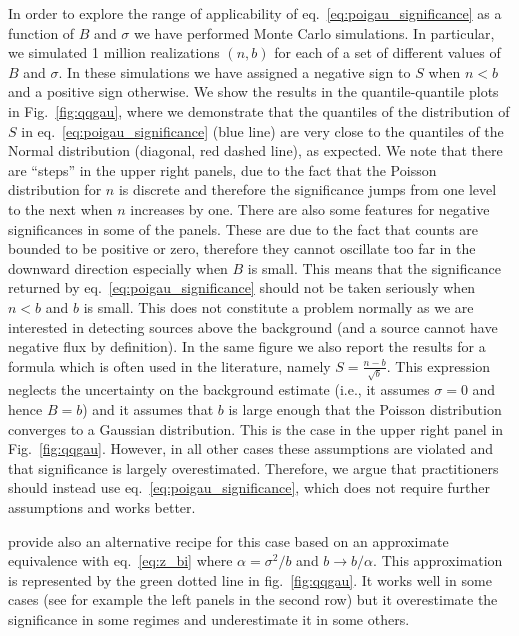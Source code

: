 \documentclass[twocolumn]{aastex61}
\renewcommand{\textbf}{}
\begin{document}
In order to explore the range of applicability of eq.~\ref{eq:poigau_significance} as a function of $B$ and $\sigma$ we have performed Monte Carlo simulations. In particular, we simulated 1 million realizations $(n, b)$ for each of a set of different values of $B$ and $\sigma$. In these simulations we have assigned a negative sign to $S$ when $n<b$ and a positive sign otherwise. We show the results in the quantile-quantile plots in Fig.~\ref{fig:qqgau}, where we demonstrate that the quantiles of the distribution of $S$ in eq.~\ref{eq:poigau_significance} (blue line) are very close to the quantiles of the Normal distribution (diagonal, red dashed line), as expected. We note that there are ``steps'' in the upper right panels, due to the fact that the Poisson distribution for $n$ is discrete and therefore the significance jumps from one level to the next when $n$ increases by one. There are also some features for negative significances in some of the panels. These are due to the fact that counts are bounded to be positive or zero, therefore they cannot oscillate too far in the downward direction especially when $B$ is small. This means that the significance returned by eq.~\ref{eq:poigau_significance} should not be taken seriously when $n < b$ and $b$ is small. This does not constitute a problem normally as we are interested in detecting sources above the background (and a source cannot have negative flux by definition).
\textbf{In the same figure we also report the results for a formula which is often used in the literature, namely $S=\frac{n-b}{\sqrt{b}}$. This expression neglects the uncertainty on the background estimate (i.e., it assumes $\sigma=0$ and hence $B=b$) and it assumes that $b$ is large enough that the Poisson distribution converges to a Gaussian distribution. This is the case in the upper right panel in Fig.~\ref{fig:qqgau}. However, in all other cases these assumptions are violated and that significance is largely overestimated}. Therefore, we argue that practitioners should instead use eq.~\ref{eq:poigau_significance}, which does not require further assumptions and works better.

\textbf{\citet{Cousins2008} provide also an alternative recipe for this case based on an approximate equivalence with eq.~\ref{eq:z_bi} where $\alpha = \sigma^2 / b$ and $b \rightarrow b / \alpha$. This approximation is represented by the green dotted line in fig.~\ref{fig:qqgau}. It works well in some cases (see for example the left panels in the second row) but it overestimate the significance in some regimes and underestimate it in some others.}
\end{document}
